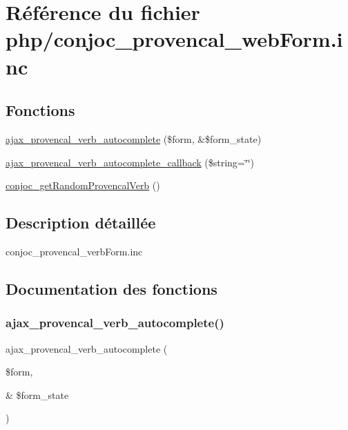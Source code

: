 \hypertarget{php_2conjoc__provencal__web_form_8inc}{}\section{Référence du fichier php/conjoc\+\_\+provencal\+\_\+web\+Form.inc}
\label{php_2conjoc__provencal__web_form_8inc}
\subsection*{Fonctions}
\begin{DoxyCompactItemize}
\item 
\hyperlink{php_2conjoc__provencal__web_form_8inc_aac31f536bfd83a81f1ea012f5ecdc9ad}{ajax\+\_\+provencal\+\_\+verb\+\_\+autocomplete} (\$form, \&\$form\+\_\+state)
\item 
\hyperlink{php_2conjoc__provencal__web_form_8inc_a2f2da1c5cc327e80252b73dd250aa363}{ajax\+\_\+provencal\+\_\+verb\+\_\+autocomplete\+\_\+callback} (\$string=\char`\"{}\char`\"{})
\item 
\hyperlink{php_2conjoc__provencal__web_form_8inc_a8e95bdf8c2d2a450e6485d589788aa83}{conjoc\+\_\+get\+Random\+Provencal\+Verb} ()
\end{DoxyCompactItemize}


\subsection{Description détaillée}
conjoc\+\_\+provencal\+\_\+verb\+Form.\+inc 

\subsection{Documentation des fonctions}
\hypertarget{php_2conjoc__provencal__web_form_8inc_aac31f536bfd83a81f1ea012f5ecdc9ad}{}\label{php_2conjoc__provencal__web_form_8inc_aac31f536bfd83a81f1ea012f5ecdc9ad} 
\subsubsection{\texorpdfstring{ajax\+\_\+provencal\+\_\+verb\+\_\+autocomplete()}{ajax\_provencal\_verb\_autocomplete()}}
{\footnotesize\ttfamily ajax\+\_\+provencal\+\_\+verb\+\_\+autocomplete (\begin{DoxyParamCaption}\item[{}]{\$form,  }\item[{\&}]{\$form\+\_\+state }\end{DoxyParamCaption})}

